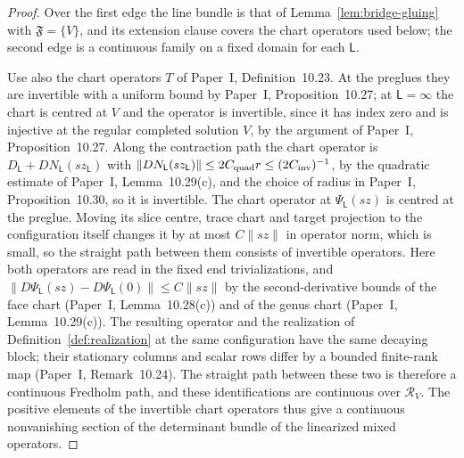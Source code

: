 \documentclass[11pt]{amsart}
\theoremstyle{definition}
\theoremstyle{remark}
\theoremstyle{plain}
\numberwithin{equation}{section}
\begin{document}
\begin{proof}
Over the first edge the line bundle is that of
Lemma~\ref{lem:bridge-gluing} with $\mathfrak F=\{V\}$, and its
extension clause covers the chart operators used below; the second edge is a
continuous family on a fixed domain for each $\mathsf L$.

Use also the chart operators $T$ of Paper~I, Definition~10.23. At the
preglues they are invertible with a uniform bound by Paper~I,
Proposition~10.27; at $\mathsf L=\infty$ the chart is centred at $V$
and the operator is invertible, since it has index zero and is injective
at the regular completed solution $V$, by the argument of Paper~I,
Proposition~10.27.
Along the contraction path the chart operator is
$D_{\mathsf L}+DN_{\mathsf L}(sz_{\mathsf L})$ with
$\|DN_{\mathsf L}(sz_{\mathsf L})\|\le2C_{\rm quad}r\le(2C_{\rm inv})^{-1}$,
by the quadratic estimate of Paper~I, Lemma~10.29(c), and the choice of
radius in Paper~I, Proposition~10.30, so it is invertible.
The chart operator at $\Psi_{\mathsf L}(sz)$ is centred at the preglue.
Moving its slice centre, trace chart and target projection to the
configuration itself changes it by at most $C\|sz\|$ in operator norm,
which is small, so the straight path between them consists of invertible
operators. Here both operators are read in the fixed end trivializations,
and $\|D\Psi_{\mathsf L}(sz)-D\Psi_{\mathsf L}(0)\|\le C\|sz\|$ by the
second-derivative bounds of the face chart (Paper~I, Lemma~10.28(c)) and
of the genus chart (Paper~I, Lemma~10.29(c)).
The resulting operator and the realization of
Definition~\ref{def:realization} at the same
configuration have the same decaying block; their stationary columns
and scalar rows differ by a bounded finite-rank map (Paper~I, Remark~10.24). The straight path between these two is
therefore a continuous Fredholm path, and these identifications are
continuous over $\mathcal R_V$. The positive elements of the invertible
chart operators thus give a continuous nonvanishing section of the
determinant bundle of the linearized mixed operators.


\end{proof}
\end{document}
